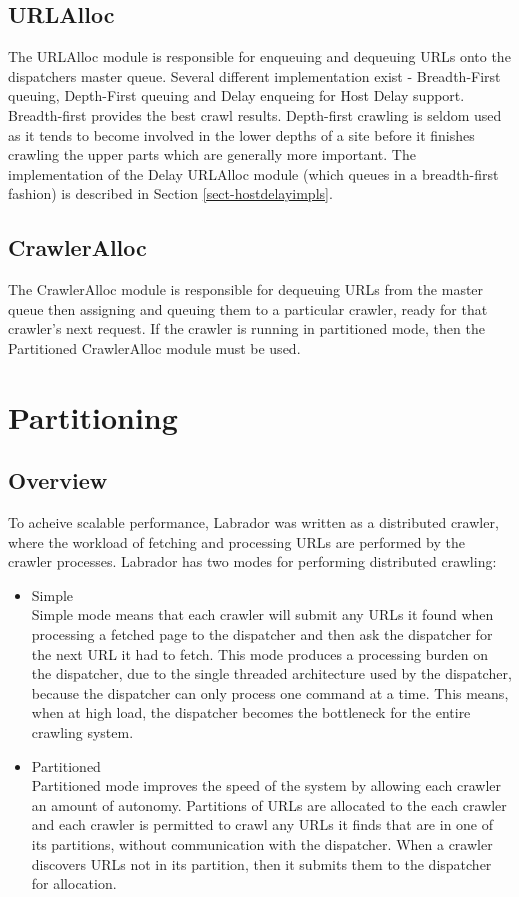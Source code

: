 \subsection{URLAlloc}
The URLAlloc module is responsible for enqueuing and dequeuing URLs onto the dispatchers master queue. Several different implementation exist - Breadth-First queuing, Depth-First queuing and Delay enqueing for Host Delay support. Breadth-first provides the best crawl results\cite{ref8}. Depth-first crawling is seldom used as it tends to become involved in the lower depths of a site before it finishes crawling the upper parts which are generally more important. The implementation of the Delay URLAlloc module (which queues in a breadth-first fashion) is described in Section \ref{sect-hostdelayimpls}. 
\subsection{CrawlerAlloc}
The CrawlerAlloc module is responsible for dequeuing URLs from the master queue then assigning and queuing them to a particular crawler, ready for that crawler's next request. If the crawler is running in partitioned mode, then the Partitioned CrawlerAlloc module must be used.

\section{Partitioning}\label{sect-partitioning}
\subsection{Overview}
To acheive scalable performance, Labrador was written as a distributed crawler, where the workload of fetching and processing URLs are performed by the crawler processes. Labrador has two modes for performing distributed crawling:
\begin{itemize}
\item{Simple\\} 
Simple mode means that each crawler will submit any URLs it found when processing a fetched page to the dispatcher and then ask the dispatcher for the next URL it had to fetch. This mode produces a processing burden on the dispatcher, due to the single threaded architecture used by the dispatcher, because the dispatcher can only process one command at a time. This means, when at high load, the dispatcher becomes the bottleneck for the entire crawling system.
\item{Partitioned\\}
Partitioned mode improves the speed of the system by allowing each crawler an amount of autonomy. Partitions of URLs are allocated to the each crawler and each crawler is permitted to crawl any URLs it finds that are in one of its partitions, without communication with the dispatcher. When a crawler discovers URLs not in its partition, then it submits them to the dispatcher for allocation.
\end{itemize}

